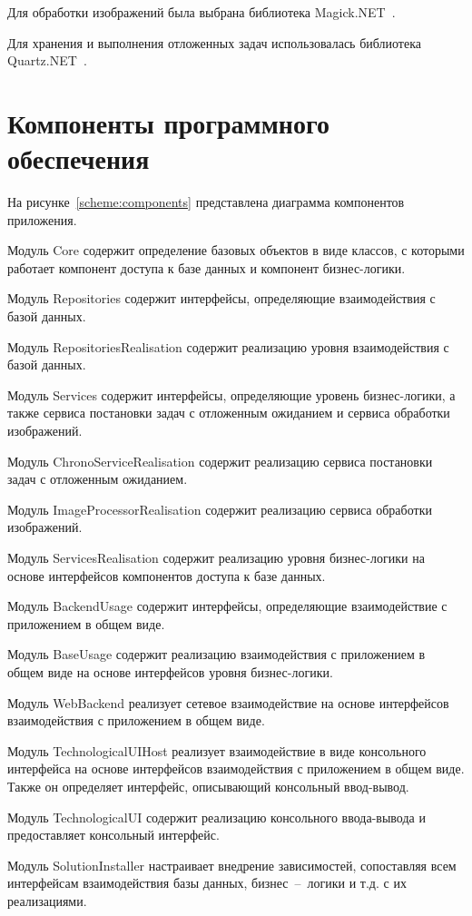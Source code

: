 Для обработки изображений была выбрана библиотека Magick.NET~\cite{magicknet}. 

Для хранения и выполнения отложенных задач использовалась библиотека Quartz.NET~\cite{quartznet}.

\section{Компоненты программного обеспечения}
На рисунке~\ref{scheme:components} представлена диаграмма компонентов приложения.

Модуль Core содержит определение базовых объектов в виде классов, с которыми работает компонент доступа к базе данных и компонент бизнес-логики.

Модуль Repositories содержит интерфейсы, определяющие взаимодействия с базой данных. 

Модуль RepositoriesRealisation содержит реализацию уровня взаимодействия с базой данных. 

Модуль Services содержит интерфейсы, определяющие уровень бизнес-логики, а также сервиса постановки задач с отложенным ожиданием и сервиса обработки изображений.

Модуль ChronoServiceRealisation содержит реализацию сервиса постановки задач с отложенным ожиданием.

Модуль ImageProcessorRealisation содержит реализацию сервиса обработки изображений.

Модуль ServicesRealisation содержит реализацию уровня бизнес-логики на основе интерфейсов компонентов доступа к базе данных.

Модуль BackendUsage содержит интерфейсы, определяющие взаимодействие с приложением в общем виде.

Модуль BaseUsage содержит реализацию взаимодействия с приложением в общем виде на основе интерфейсов уровня бизнес-логики.

Модуль WebBackend реализует сетевое взаимодействие на основе интерфейсов взаимодействия с приложением в общем виде.

Модуль TechnologicalUIHost реализует взаимодействие в виде консольного интерфейса на основе интерфейсов взаимодействия с приложением в общем виде. Также он определяет интерфейс, описывающий консольный ввод-вывод.

Модуль TechnologicalUI содержит реализацию консольного ввода-вывода и предоставляет  консольный интерфейс.

Модуль SolutionInstaller настраивает внедрение зависимостей, сопоставляя всем интерфейсам взаимодействия базы данных, бизнес~--~логики и т.д. с их реализациями.

